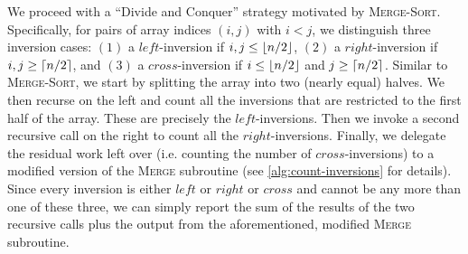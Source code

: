 \documentclass[10pt, letterpaper]{article}
\begin{document}
\begin{enumerate}[label={\bfseries Q\arabic*.}]
\begin{enumerate}
\begin{enumerate}[label={\arabic*.}, leftmargin=*]
            We proceed with a ``Divide and Conquer'' strategy motivated by \textsc{Merge-Sort}. Specifically,
            for pairs of array indices $(i, j)$ with $i < j$, we distinguish three inversion cases: $(1)$ a
            $left$-inversion if $i, j \leq \lfloor n/2 \rfloor$, $(2)$ a $right$-inversion if $i, j \geq \lceil n/2 \rceil$,
            and $(3)$ a $cross$-inversion if $i \leq \lfloor n/2 \rfloor$ and $j \geq \lceil n/2 \rceil$. Similar to
            \textsc{Merge-Sort}, we start by splitting the array into two (nearly equal) halves. We then recurse
            on the left and count all the inversions that are restricted to the first half of the array. These
            are precisely the $left$-inversions. Then we invoke a second recursive call on the right to count
            all the $right$-inversions. Finally, we delegate the residual work left over (i.e. counting the
            number of $cross$-inversions) to a modified version of the \textsc{Merge} subroutine (see
            \autoref{alg:count-inversions} for details).  Since every inversion is either $left$ or $right$ or
            $cross$ and cannot be any more than one of these three, we can simply report the sum of the results
            of the two recursive calls plus the output from the aforementioned, modified \textsc{Merge} subroutine.


\end{enumerate}
\end{enumerate}
\end{enumerate}
\end{document}
